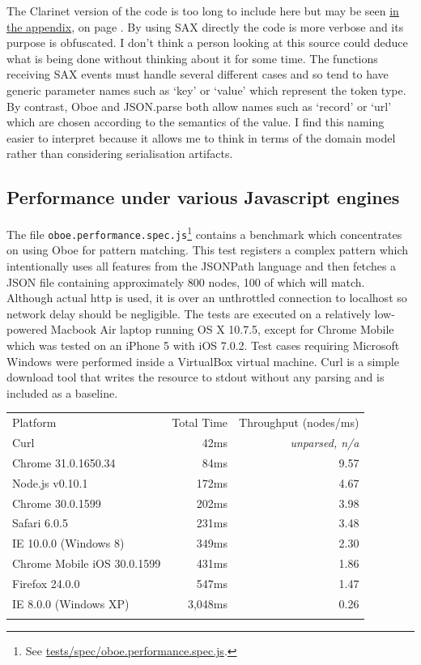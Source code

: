 \documentclass[]{article}
\begin{document}
The Clarinet version of the code is too long to include here but may be
seen \hyperref[header_benchmarkClient]{in the appendix}, on page
\pageref{src_benchmarkClient}. By using SAX directly the code is more
verbose and its purpose is obfuscated. I don't think a person looking at
this source could deduce what is being done without thinking about it
for some time. The functions receiving SAX events must handle several
different cases and so tend to have generic parameter names such as
`key' or `value' which represent the token type. By contrast, Oboe and
JSON.parse both allow names such as `record' or `url' which are chosen
according to the semantics of the value. I find this naming easier to
interpret because it allows me to think in terms of the domain model
rather than considering serialisation artifacts.

\subsection{Performance under various Javascript engines}

The file \texttt{oboe.performance.spec.js}\footnote{See
  \href{https://github.com/jimhigson/oboe.js/blob/master/test/specs/oboe.performance.spec.js}{tests/spec/oboe.performance.spec.js}.}
contains a benchmark which concentrates on using Oboe for pattern
matching. This test registers a complex pattern which intentionally uses
all features from the JSONPath language and then fetches a JSON file
containing approximately 800 nodes, 100 of which will match. Although
actual http is used, it is over an unthrottled connection to localhost
so network delay should be negligible. The tests are executed on a
relatively low-powered Macbook Air laptop running OS X 10.7.5, except
for Chrome Mobile which was tested on an iPhone 5 with iOS 7.0.2. Test
cases requiring Microsoft Windows were performed inside a VirtualBox
virtual machine. Curl is a simple download tool that writes the resource
to stdout without any parsing and is included as a baseline.

\begin{longtable}[c]{@{}lrr@{}}
\hline\noalign{\medskip}
Platform & Total Time & Throughput (nodes/ms)
\\\noalign{\medskip}
\hline\noalign{\medskip}
Curl & 42ms & \emph{unparsed, n/a}
\\\noalign{\medskip}
Chrome 31.0.1650.34 & 84ms & 9.57
\\\noalign{\medskip}
Node.js v0.10.1 & 172ms & 4.67
\\\noalign{\medskip}
Chrome 30.0.1599 & 202ms & 3.98
\\\noalign{\medskip}
Safari 6.0.5 & 231ms & 3.48
\\\noalign{\medskip}
IE 10.0.0 (Windows 8) & 349ms & 2.30
\\\noalign{\medskip}
Chrome Mobile iOS 30.0.1599 & 431ms & 1.86
\\\noalign{\medskip}
Firefox 24.0.0 & 547ms & 1.47
\\\noalign{\medskip}
IE 8.0.0 (Windows XP) & 3,048ms & 0.26
\\\noalign{\medskip}
\hline
\end{longtable}
\end{document}
